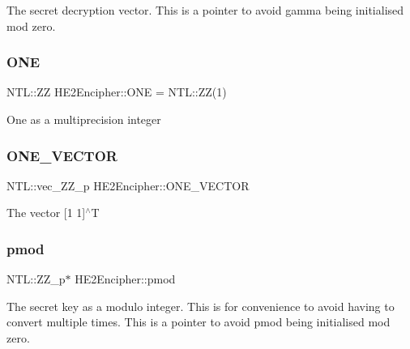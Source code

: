 The secret decryption vector. This is a pointer to avoid gamma being initialised mod zero. \mbox{\label{classHE2Encipher_a85145ccd52161ab492eca360daad9b00}} 
\subsubsection{\texorpdfstring{O\+NE}{ONE}}
{\footnotesize\ttfamily N\+T\+L\+::\+ZZ H\+E2\+Encipher\+::\+O\+NE = N\+T\+L\+::\+ZZ(1)\hspace{0.3cm}{\ttfamily [static]}}

One as a multiprecision integer \mbox{\label{classHE2Encipher_a4099b9dff30fbe3fa5a36d7f5a8a2073}} 
\subsubsection{\texorpdfstring{O\+N\+E\+\_\+\+V\+E\+C\+T\+OR}{ONE\_VECTOR}}
{\footnotesize\ttfamily N\+T\+L\+::vec\+\_\+\+Z\+Z\+\_\+p H\+E2\+Encipher\+::\+O\+N\+E\+\_\+\+V\+E\+C\+T\+OR\hspace{0.3cm}{\ttfamily [static]}}

The vector \mbox{[}1 1\mbox{]}$^\wedge$T \mbox{\label{classHE2Encipher_a0fc7c51d125b4b638b59dfe5bd99976c}} 
\subsubsection{\texorpdfstring{pmod}{pmod}}
{\footnotesize\ttfamily N\+T\+L\+::\+Z\+Z\+\_\+p$\ast$ H\+E2\+Encipher\+::pmod\hspace{0.3cm}{\ttfamily [protected]}}

The secret key as a modulo integer. This is for convenience to avoid having to convert multiple times. This is a pointer to avoid pmod being initialised mod zero. \mbox{\label{classHE2Encipher_af01e9f2e19df354cecde3f7ea66524a0}} 
